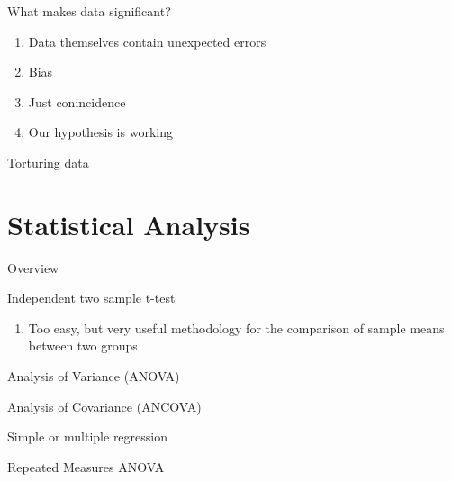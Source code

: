 \documentclass[9pt,ignorenonframetext,xcolor=dvipsnames]{beamer}
\providecommand{\tightlist}{%
  \setlength{\itemsep}{0pt}\setlength{\parskip}{0pt}}
\newlength{\wideitemsep}
\let\olditem\item
\renewcommand{\item}{\setlength{\itemsep}{\wideitemsep}\olditem}
\begin{document}
\begin{frame}{What makes data significant?}

\begin{enumerate}
\def\labelenumi{\arabic{enumi}.}
\tightlist
\item
  Data themselves contain unexpected errors
\item
  Bias
\item
  Just conincidence
\item
  Our hypothesis is working
\end{enumerate}

\end{frame}

\begin{frame}{Torturing data}

\end{frame}

\section{Statistical Analysis}\label{statistical-analysis}

\begin{frame}{Overview}

\end{frame}

\begin{frame}{Independent two sample t-test}

\begin{enumerate}
\def\labelenumi{\arabic{enumi}.}
\tightlist
\item
  Too easy, but very useful methodology for the comparison of sample
  means between two groups
\end{enumerate}

\end{frame}

\begin{frame}{Analysis of Variance (ANOVA)}

\end{frame}

\begin{frame}{Analysis of Covariance (ANCOVA)}

\end{frame}

\begin{frame}{Simple or multiple regression}

\end{frame}

\begin{frame}{Repeated Measures ANOVA}

\end{frame}
\end{document}

